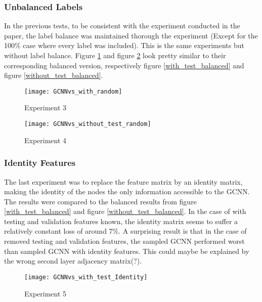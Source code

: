 \documentclass{article}
\begin{document}
\subsubsection*{Unbalanced Labels}
In the previous tests, to be consistent with the experiment conducted in the paper, the label balance was maintained thorough the experiment (Except for the 100\% case where every label was included). This is the same experiments %
 but without %
 label balance. Figure \ref{with_test_unbalanced} and figure \ref{without_test_unbalanced} look pretty %
  similar to their corresponding balanced version, respectively figure \ref{with_test_balanced} and figure \ref{without_test_balanced}.

\begin{figure}[h]
\centering
\texttt{[image: GCNNvs\_with\_random]}
\caption{
Experiment 3
}
\label{with_test_unbalanced}
\end{figure}

\begin{figure}[h]
\centering
\texttt{[image: GCNNvs\_without\_test\_random]}
\caption{
Experiment 4
}
\label{without_test_unbalanced}
\end{figure}

\subsubsection*{Identity Features}
The last experiment was to replace the feature matrix by an identity matrix, making the identity of the nodes the only information accessible to the GCNN. The results were compared to the balanced results from figure \ref{with_test_balanced} and figure \ref{without_test_balanced}. In the case %
of with testing and validation features known, the identity matrix seems %
 to suffer a relatively constant loss of around 7\%. A surprising result is that in the case of removed testing and validation features, the sampled GCNN performed worst than sampled GCNN with identity features. %
  This could maybe %
 be explained by the wrong second layer adjacency matrix(?).

\begin{figure}[h]
\centering
\texttt{[image: GCNNvs\_with\_test\_Identity]}
\caption{
Experiment 5
}
\label{with_test_balanced_Iden}
\end{figure}
\end{document}
